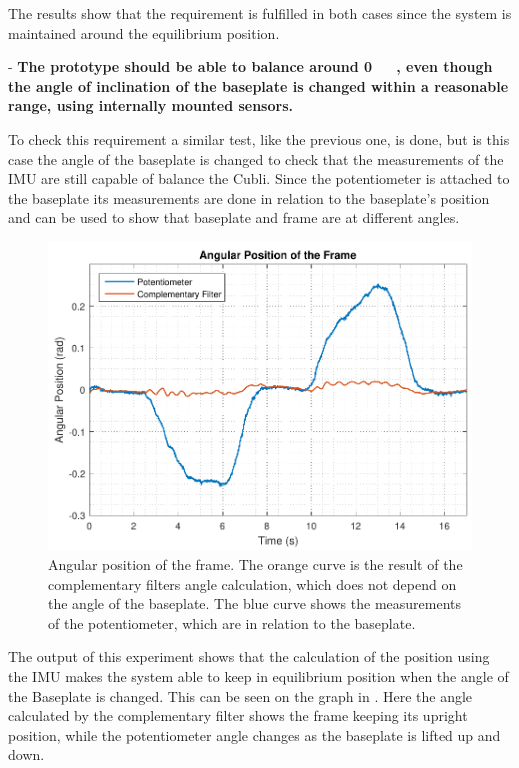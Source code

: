 The results show that the requirement is fulfilled in both cases since the system is maintained around the equilibrium position.

- \textbf{The prototype should be able to balance around \si{0\ \rad}, even though the angle of inclination of the baseplate is changed within a reasonable range, using internally mounted sensors.}

To check this requirement a similar test, like the previous one, is done, but is this case the angle of the baseplate is changed to check that the measurements of the IMU are still capable of balance the Cubli. Since the potentiometer is attached to the baseplate its measurements are done in relation to the baseplate's position and can be used to show that baseplate and frame are at different angles.
%
\begin{figure}[H]
	\centering
	\includegraphics[scale=0.55]{figures/testReq2}
	\caption{Angular position of the frame. The orange curve is the result of the complementary filters angle calculation, which does not depend on the angle of the baseplate. The blue curve shows the measurements of the potentiometer, which are in relation to the baseplate.}
	\label{testReq2}
\end{figure}\vspace{-18pt}
%
The output of this experiment shows that the calculation of the position using the IMU makes the system able to keep in equilibrium position when the angle of the Baseplate is changed. This can be seen on the graph in . Here the angle calculated by the complementary filter shows the frame keeping its upright position, while the potentiometer angle changes as the baseplate is lifted up and down. 

